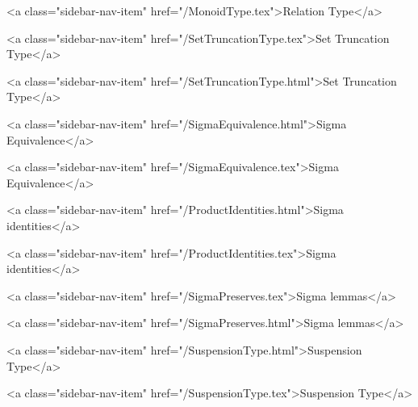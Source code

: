       
        
          <a class="sidebar-nav-item" href="/MonoidType.tex">Relation Type</a>
        
      
    
      
        
          <a class="sidebar-nav-item" href="/SetTruncationType.tex">Set Truncation Type</a>
        
      
    
      
        
          <a class="sidebar-nav-item" href="/SetTruncationType.html">Set Truncation Type</a>
        
      
    
      
        
          <a class="sidebar-nav-item" href="/SigmaEquivalence.html">Sigma Equivalence</a>
        
      
    
      
        
          <a class="sidebar-nav-item" href="/SigmaEquivalence.tex">Sigma Equivalence</a>
        
      
    
      
        
          <a class="sidebar-nav-item" href="/ProductIdentities.html">Sigma identities</a>
        
      
    
      
        
          <a class="sidebar-nav-item" href="/ProductIdentities.tex">Sigma identities</a>
        
      
    
      
        
          <a class="sidebar-nav-item" href="/SigmaPreserves.tex">Sigma lemmas</a>
        
      
    
      
        
          <a class="sidebar-nav-item" href="/SigmaPreserves.html">Sigma lemmas</a>
        
      
    
      
        
          <a class="sidebar-nav-item" href="/SuspensionType.html">Suspension Type</a>
        
      
    
      
        
          <a class="sidebar-nav-item" href="/SuspensionType.tex">Suspension Type</a>
        
